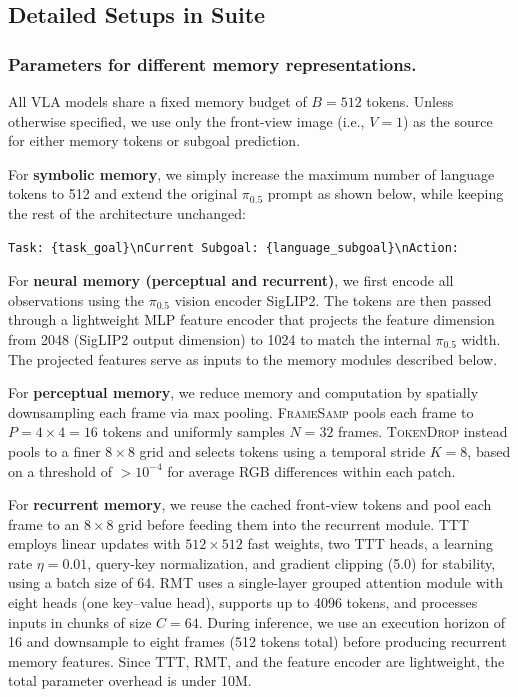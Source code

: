 \subsection{Detailed Setups in \modelname\xspace Suite}
\label{sec:mme_vla_model}

\subsubsection{Parameters for different memory representations.}

All VLA models share a fixed memory budget of $B=512$ tokens.
Unless otherwise specified, we use only the front-view image (i.e., $V=1$) as the source for either memory tokens or subgoal prediction.

For \textbf{symbolic memory}, we simply increase the maximum number of language tokens to 512 and extend the original $\pi_{0.5}$ prompt as shown below, while keeping the rest of the architecture unchanged:
\begin{center}
\begin{lstlisting}[basicstyle=\ttfamily\footnotesize]
Task: {task_goal}\nCurrent Subgoal: {language_subgoal}\nAction:
\end{lstlisting}
\end{center}

For \textbf{neural memory (perceptual and recurrent)}, we first encode all observations using the $\pi_{0.5}$ vision encoder SigLIP2. The tokens are then passed through a lightweight MLP feature encoder that projects the feature dimension from 2048 (SigLIP2 output dimension) to 1024 to match the internal $\pi_{0.5}$ width. 
The projected features serve as inputs to the memory modules described below. 

For \textbf{perceptual memory}, we reduce memory and computation by spatially downsampling each frame via max pooling. \textsc{FrameSamp} pools each frame to $P=4\times4=16$ tokens and uniformly samples $N=32$ frames. \textsc{TokenDrop} instead pools to a finer $8\times8$ grid and selects tokens using a temporal stride $K=8$, based on a threshold of $>10^{-4}$ for average RGB differences within each patch.

For \textbf{recurrent memory}, we reuse the cached front-view tokens and pool each frame to an $8\times8$ grid before feeding them into the recurrent module. TTT employs linear updates \cite{sun2024learning} with $512\times512$ fast weights, two TTT heads, a learning rate $\eta=0.01$, query-key normalization, and gradient clipping (5.0) for stability, using a batch size of 64. RMT uses a single-layer grouped attention module with eight heads (one key–value head), supports up to 4096 tokens, and processes inputs in chunks of size $C=64$. During inference, we use an execution horizon of 16 and downsample to eight frames (512 tokens total) before producing recurrent memory features. Since TTT, RMT, and the feature encoder are lightweight, the total parameter overhead is under 10M.

